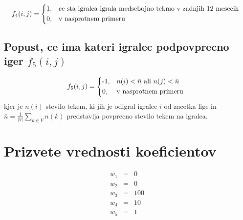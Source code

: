\documentclass[a4paper, 11pt]{article}
\newcommand*\mean[1]{\bar{#1}}
\begin{document}
\begin{equation}
	f_4(i,j) = 
		\begin{dcases*}
			\text{1,} & ce sta igralca igrala medsebojno tekmo v zadnjih 12 mesecih \\
			\text{0,} & v nasprotnem primeru
		\end{dcases*}
\end{equation}

\subsection{Popust, ce ima kateri igralec podpovprecno iger $f_5(i,j)$}

\begin{equation}
	f_5(i,j) = 
		\begin{dcases*}
			\text{-1,} & $n(i) < \mean{n}$ ali $n(j) < \mean{n}$ \\
			\text{0,} & v nasprotnem primeru
		\end{dcases*}
\end{equation}
kjer je $n(i)$ stevilo tekem, ki jih je odigral igralec $i$ od zacetka lige in $\mean{n} = \frac{1}{\left|V\right|}\sum_{k \in V}n(k)$ predstavlja povprecno stevilo tekem na igralca.


\section{Prizvete vrednosti koeficientov}
\begin{eqnarray}
	w_1 &=& 0 \\ \nonumber
	w_2 &=& 0 \\ \nonumber
	w_3 &=& 100 \\ \nonumber
	w_4 &=& 10 \\ \nonumber
	w_5 &=& 1
\end{eqnarray}
\end{document}
